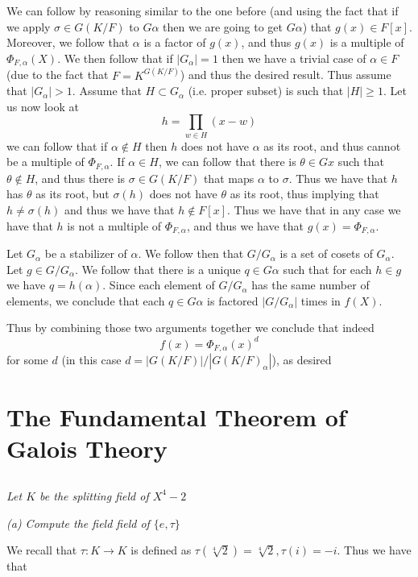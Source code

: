 \documentclass[11pt,oneside,titlepage]{book}
\newcommand{\set}[1]{\{ #1 \}}
\begin{document}
We can follow by reasoning similar to the one before (and using the
fact that if we apply $\sigma \in G(K/F)$ to $G\alpha$ then we are
going to get $G\alpha$) that $g(x) \in F[x]$. Moreover, we follow that
$\alpha$ is a factor of $g(x)$, and thus $g(x)$ is a multiple of
$\Phi_{F, \alpha}(X)$.
We then follow that if $|G_\alpha| = 1$ then we have a trivial case of
$\alpha \in F$ (due to the fact that $F = K^{G(K/F)}$) and thus the
desired result. Thus assume that $|G_\alpha| > 1$. Assume that $H
\subset G_\alpha$ (i.e. proper subset) is such that $|H| \geq 1$.  Let
us now look at
$$h = \prod_{w \in H}(x - w)$$
we can follow that if $\alpha \notin H$ then $h$ does not have
$\alpha$ as its root, and thus cannot be a multiple of $\Phi_{F,
\alpha}$. If $\alpha \in H$, we can follow that there is $\theta \in
Gx$ such that $\theta \notin H$, and thus there is $\sigma \in G(K/F)$
that maps $\alpha$ to $\sigma$. Thus we have that $h$ has $\theta$ as
its root, but $\sigma(h)$ does not have $\theta$ as its root, thus
implying that $h \neq \sigma(h)$ and thus we have that $h \notin
F[x]$.  Thus we have that in any case we have that $h$ is not a
multiple of $\Phi_{F, \alpha}$, and thus we have that $g(x) = \Phi_{F,
\alpha}$.

Let $G_\alpha$ be a stabilizer of $\alpha$. We follow then that
$G/G_\alpha$ is a set of cosets of $G_\alpha$. Let $g \in G/G_\alpha$.
We follow that there is a unique $q \in G\alpha$ such that for
each $h \in g$ we have $q = h(\alpha)$. Since each element of
$G/G_\alpha$ has the same number of elements, we conclude
that each $q \in G\alpha$ is factored $|G/G_\alpha|$ times
in $f(X)$.

Thus by combining those two arguments together we conclude that indeed
$$f(x) = \Phi_{F, \alpha}(x)^d$$
for some $d$ (in this case $d = |G(K/F)| / |G(K/F)_\alpha|$), as
desired

\section{The Fundamental Theorem of Galois Theory}

\subsection{}

\textit{Let $K$ be the splitting field of $X^4 - 2$}

\textit{(a) Compute the field field of $\set{e, \tau}$}

We recall that $\tau: K \to K$ is defined as $\tau(\sqrt[4]{2}) =
\sqrt[4]{2}, \tau(i) = -i$. Thus we have that
\end{document}
